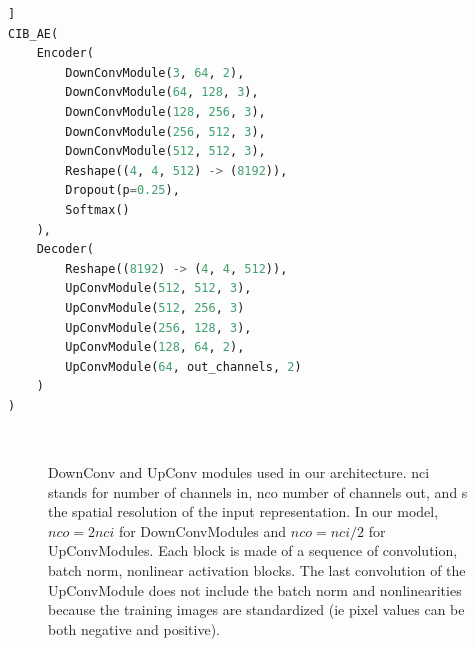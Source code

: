 \begin{appendices}
\begin{lstlisting}[language=Python, caption=CIB-AE Architecture Detail, label=cibae_arch]]
CIB_AE(
    Encoder(
        DownConvModule(3, 64, 2),
        DownConvModule(64, 128, 3),
        DownConvModule(128, 256, 3),
        DownConvModule(256, 512, 3),
        DownConvModule(512, 512, 3),
        Reshape((4, 4, 512) -> (8192)),
        Dropout(p=0.25),
        Softmax()
    ), 
    Decoder(
        Reshape((8192) -> (4, 4, 512)),
        UpConvModule(512, 512, 3),
        UpConvModule(512, 256, 3)
        UpConvModule(256, 128, 3),
        UpConvModule(128, 64, 2),
        UpConvModule(64, out_channels, 2)
    )
)
\end{lstlisting}

\begin{figure}
    \begin{center}
    \\
    \end{center}
    \caption{
    \protect{} DownConv and \protect{} UpConv modules used in our architecture. nci stands for number of channels in, nco number of channels out, and s the spatial resolution of the input representation. In our model, $nco = 2 nci$ for DownConvModules and $nco = nci/2$ for UpConvModules. Each block is made of a sequence of convolution, batch norm, nonlinear activation blocks. The last convolution of the UpConvModule does not include the batch norm and nonlinearities because the training images are standardized (ie pixel values can be both negative and positive).
    }
    \label{fig:cib-ae_modules}
\end{figure}


\end{appendices}
